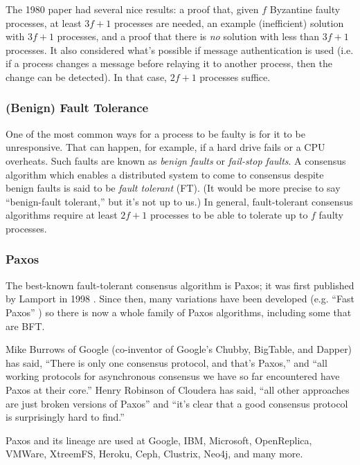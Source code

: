 The 1980 paper had several nice results:
a proof that, given $f$ Byzantine faulty processes, at least $3f+1$ processes are needed,
an example (inefficient) solution with $3f+1$ processes, 
and a proof that there is \emph{no} solution with less than $3f+1$ processes.
It also considered what's possible if message authentication is used (i.e. if a process changes a message before relaying it to another process, then the change can be detected). In that case, $2f+1$ processes suffice.

\subsubsection{(Benign) Fault Tolerance}
One of the most common ways for a process to be faulty is for it to be unresponsive. That can happen, for example, if a hard drive fails or a CPU overheats. Such faults are known as \emph{benign faults} or \emph{fail-stop faults}. A consensus algorithm which enables a distributed system to come to consensus despite benign faults is said to be \emph{fault tolerant} (FT). (It would be more precise to say ``benign-fault tolerant,'' but it's not up to us.) In general, fault-tolerant consensus algorithms require at least $2f+1$ processes to be able to tolerate up to $f$ faulty processes.

\subsubsection{Paxos}
The best-known fault-tolerant consensus algorithm is Paxos; it was first published by Lamport in 1998 \cite{lamport1998part}. Since then, many variations have been developed (e.g. ``Fast Paxos'' \cite{lamport2006fast}) so there is now a whole family of Paxos algorithms, including some that are BFT. \cite{lamport2011byzantizing}

Mike Burrows of Google (co-inventor of Google’s Chubby, BigTable, and Dapper) has said, ``There is only one consensus protocol, and that’s Paxos,'' \cite{robinson2009paxos} and ``all working protocols for asynchronous consensus we have so far encountered have Paxos at their core.'' \cite{burrows2006chubby}
Henry Robinson of Cloudera has said, ``all other approaches are just broken versions of Paxos'' and ``it’s clear that a good consensus protocol is surprisingly hard to find.'' \cite{robinson2009paxos}

Paxos and its lineage are used at Google, IBM, Microsoft, OpenReplica, VMWare, XtreemFS, Heroku, Ceph, Clustrix, Neo4j, and many more. \cite{wiki_paxos}

